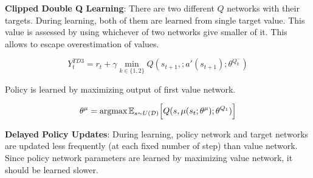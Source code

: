 \textbf{Clipped Double Q Learning}: There are two different $Q$ networks with their targets. During learning, both of them are learned from single target value. This value is assessed by using whichever of two networks give smaller of it. This allows to escape overestimation of values. 

\begin{equation}
\label{eqn:td3_target}
Y_t^{TD3} = r_t + \gamma \min_{k\in\{1,2\}} Q(s_{t+1}, ;a'(s_{t+1});\theta^{Q_k^-})
\end{equation}

Policy is learned by maximizing output of first value network.

\begin{equation}
\label{eqn:td3_value_maximization}
\theta^\mu = \operatorname{\textup{argmax}} \mathbb{E}_{s \sim U(\mathcal{D})} \Big[ Q(s, \mu(s_t;\theta^\mu);\theta^{Q_1}) \Big]
\end{equation}

\textbf{Delayed Policy Updates}: During learning, policy network and target networks are updated less frequently (at each fixed number of step) than value network. Since policy network parameters are learned by maximizing value network, it should be learned slower.